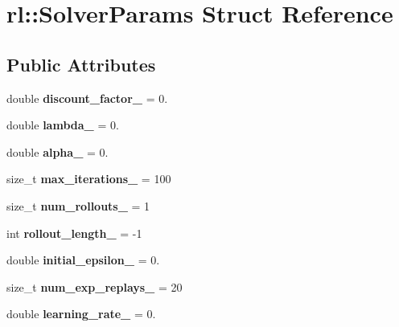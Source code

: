 \hypertarget{structrl_1_1_solver_params}{}\section{rl\+:\+:Solver\+Params Struct Reference}
\label{structrl_1_1_solver_params}
\subsection*{Public Attributes}
\begin{DoxyCompactItemize}
\item 
\hypertarget{structrl_1_1_solver_params_ae628495be6f7e8f057eb60b5d9c7fad4}{}\label{structrl_1_1_solver_params_ae628495be6f7e8f057eb60b5d9c7fad4} 
double {\bfseries discount\+\_\+factor\+\_\+} = 0.
\item 
\hypertarget{structrl_1_1_solver_params_ac8571900156cbcefdae64341a16ee1de}{}\label{structrl_1_1_solver_params_ac8571900156cbcefdae64341a16ee1de} 
double {\bfseries lambda\+\_\+} = 0.
\item 
\hypertarget{structrl_1_1_solver_params_a5e1dd6108bef14b937ba55dae3d24108}{}\label{structrl_1_1_solver_params_a5e1dd6108bef14b937ba55dae3d24108} 
double {\bfseries alpha\+\_\+} = 0.
\item 
\hypertarget{structrl_1_1_solver_params_affef10efaf1293e7024ba5ceeaee1135}{}\label{structrl_1_1_solver_params_affef10efaf1293e7024ba5ceeaee1135} 
size\+\_\+t {\bfseries max\+\_\+iterations\+\_\+} = 100
\item 
\hypertarget{structrl_1_1_solver_params_a7b5ba566ab9ce8f765467d7a956f2e5a}{}\label{structrl_1_1_solver_params_a7b5ba566ab9ce8f765467d7a956f2e5a} 
size\+\_\+t {\bfseries num\+\_\+rollouts\+\_\+} = 1
\item 
\hypertarget{structrl_1_1_solver_params_a0a07c7467520c442ef405b75f214ca2b}{}\label{structrl_1_1_solver_params_a0a07c7467520c442ef405b75f214ca2b} 
int {\bfseries rollout\+\_\+length\+\_\+} = -\/1
\item 
\hypertarget{structrl_1_1_solver_params_a19d05bfcc620af52ce595c516df4b96e}{}\label{structrl_1_1_solver_params_a19d05bfcc620af52ce595c516df4b96e} 
double {\bfseries initial\+\_\+epsilon\+\_\+} = 0.
\item 
\hypertarget{structrl_1_1_solver_params_a59f4e9853f886513cabe33ad51780202}{}\label{structrl_1_1_solver_params_a59f4e9853f886513cabe33ad51780202} 
size\+\_\+t {\bfseries num\+\_\+exp\+\_\+replays\+\_\+} = 20
\item 
\hypertarget{structrl_1_1_solver_params_ac9d7cbd3b11b63c3d80029286aba1e2a}{}\label{structrl_1_1_solver_params_ac9d7cbd3b11b63c3d80029286aba1e2a} 
double {\bfseries learning\+\_\+rate\+\_\+} = 0.
\end{DoxyCompactItemize}


